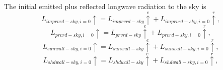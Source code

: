 \documentclass[12pt,authoryear]{elsarticle}
\numberwithin{equation}{section} %
\begin{document}
The initial emitted plus reflected longwave radiation to the sky is
\begin{equation}
L_{imprvrd-sky,i=0}\uparrow = L_{imprvrd-sky}\overset{e}{\uparrow}+L_{imprvrd-sky,i=0}\overset{r}{\uparrow},
\end{equation}
\begin{equation}
L_{prvrd-sky,i=0}\uparrow = L_{prvrd-sky}\overset{e}{\uparrow}+L_{prvrd-sky,i=0}\overset{r}{\uparrow},
\end{equation}
\begin{equation}
L_{sunwall-sky,i=0}\uparrow = L_{sunwall-sky}\overset{e}{\uparrow}+L_{sunwall-sky,i=0}\overset{r}{\uparrow},
\end{equation}
\begin{equation}
L_{shdwall-sky,i=0}\uparrow = L_{shdwall-sky}\overset{e}{\uparrow}+L_{shdwall-sky,i=0}\overset{r}{\uparrow},
\end{equation}
\end{document}
